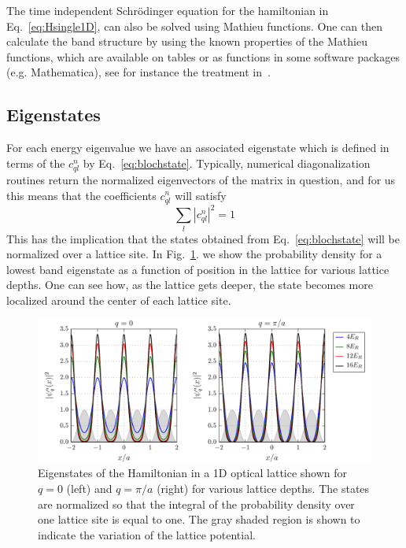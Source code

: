 \documentclass[oneside,11pt]{memoir}
\begin{document}
The time independent Schr\"{o}dinger equation for the hamiltonian in
Eq.~\ref{eq:Hsingle1D}, can also be solved using Mathieu functions.  One can
then calculate the band structure by using the known properties of the Mathieu
functions, which are available on tables or as functions in some software
packages (e.g. Mathematica), see for instance the treatment
in~\cite{PhysRev.87.807}. 

\subsection{Eigenstates}
For each energy eigenvalue we have an associated eigenstate  which is defined
in terms of the $c_{ql}^{n}$ by Eq.~\ref{eq:blochstate}.   Typically, numerical
diagonalization routines return the normalized eigenvectors of the matrix in
question,  and for us this means that the coefficients $c_{ql}^{n}$ will
satisfy
\begin{equation}
   \sum_{l} | c_{ql}^{n} |^{2} = 1 
\end{equation} 
This has the implication that the states obtained from Eq.~\ref{eq:blochstate}
will be normalized over a lattice site.  In Fig.~\ref{fig:eigenfuns1d}. we show
the probability density for a lowest band eigenstate as a function of position
in the lattice for various lattice depths.  One can see how, as the lattice
gets deeper, the state becomes more localized around the center of each lattice
site. 
\begin{figure}
\centering \includegraphics[width=\textwidth]{../figures/BandStructure_figures/eigenfuns1d.pdf}
\caption[Eigenstates in 1D lattice.]{\small Eigenstates of the Hamiltonian in a
1D optical lattice shown for $q=0$ (left) and $q=\pi/a$ (right) for various
lattice depths. The states are normalized so that the integral of the
probability density over one lattice site is equal to one.  The gray shaded
region is shown to indicate the variation of the lattice potential. }
\label{fig:eigenfuns1d}
\end{figure}
\end{document}
